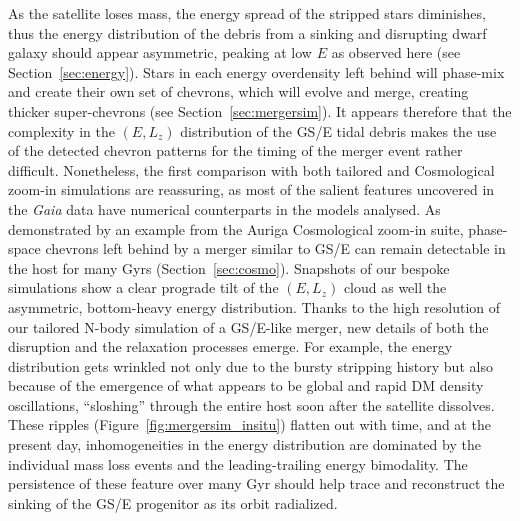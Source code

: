 \documentclass[a4paper,useAMS,usenatbib]{mnras}
\begin{document}
As the satellite loses mass, the energy spread of the stripped stars diminishes, thus the energy distribution of the debris from a sinking and disrupting dwarf galaxy should appear asymmetric, peaking at low $E$ as observed here (see Section~\ref{sec:energy}). Stars in each energy overdensity left behind will phase-mix and create their own set of chevrons, which will evolve and merge, creating thicker super-chevrons (see Section~\ref{sec:mergersim}). It appears therefore that the complexity in the $(E, L_z)$ distribution of the GS/E tidal debris makes the use of the detected chevron patterns for the timing of the merger event rather difficult. Nonetheless, the first comparison with both tailored and Cosmological zoom-in simulations are reassuring, as most of the salient features uncovered in the {\it Gaia} data have numerical counterparts in the models analysed. As demonstrated by an example from the Auriga Cosmological zoom-in suite, phase-space chevrons left behind by a merger similar to GS/E can remain detectable in the host for many Gyrs (Section~\ref{sec:cosmo}). Snapshots of our bespoke simulations show a clear prograde tilt of the $(E, L_z)$  cloud as well the asymmetric, bottom-heavy energy distribution. Thanks to the high resolution of our tailored N-body simulation of a GS/E-like merger, new details of both the disruption and the relaxation processes emerge. For example, the energy distribution gets wrinkled not only due to the bursty stripping history but also because of the emergence of what appears to be global and rapid DM density oscillations, ``sloshing'' through the entire host soon after the satellite dissolves. These ripples (Figure~\ref{fig:mergersim_insitu}) flatten out with time, and at the present day, inhomogeneities in the energy distribution are dominated by the individual mass loss events and the leading-trailing energy bimodality. The persistence of these feature over many Gyr should help trace and reconstruct the sinking of the GS/E progenitor as its orbit radialized. 
\end{document}
